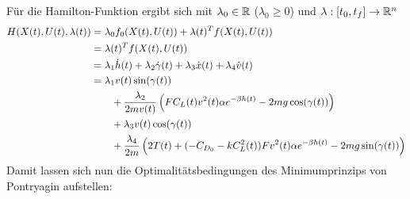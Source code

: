 Für die Hamilton-Funktion ergibt sich mit $\lambda_0 \in \mathbb{R}$ ($\lambda_0 \geq 0$) und $\lambda : [t_0,t_f] \to \mathbb{R}^n$
\[\begin{split}
H(X(t),U(t),\lambda(t)) &= \lambda_0 f_0(X(t),U(t)) + \lambda(t)^T f(X(t),U(t)) \\\
&= \lambda(t)^T f(X(t),U(t)) \\\
&= \lambda_1 \dot{h}(t) + \lambda_2 \dot{\gamma}(t)  + \lambda_3 \dot{x}(t) + \lambda_4 \dot{v}(t) \\\
&= \lambda_1 v(t) \sin(\gamma(t)) \\\
&\hspace{7mm} + \dfrac{\lambda_2}{2mv(t)} \left(F C_L(t)v^2(t) \alpha e^{-\beta h(t)} - 2 m g \cos(\gamma(t)) \right) \\\
&\hspace{7mm} + \lambda_3 v(t) \cos(\gamma(t)) \\\
&\hspace{7mm} + \dfrac{\lambda_4}{2m} \left(2T(t) + (-C_{D_0}-k C_L^2(t)) F  v^2(t) \alpha e^{-\beta h(t)} - 2 m g \sin(\gamma(t)) \right) 
\end{split}\]
Damit lassen sich nun die Optimalitätsbedingungen des Minimumprinzips von Pontryagin aufstellen:

